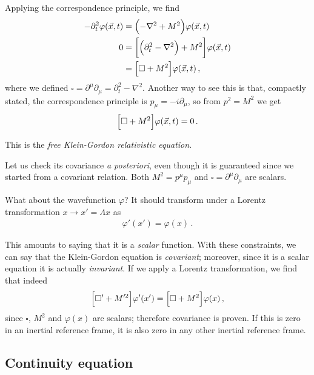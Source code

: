 \documentclass[main.tex]{subfiles}
\begin{document}
Applying the correspondence principle, we find 
%
\begin{align}
- \partial_{t}^2 \varphi (\vec{x}, t) &= \qty(- \nabla^2 + M^2) \varphi (\vec{x}, t)  \\
0 &= \qty[\qty(\partial_{t}^2 - \nabla^2) + M^2] \varphi (\vec{x}, t)   \\
&= \qty[\square + M^2] \varphi (\vec{x}, t)
\,,
\end{align}
%
where we defined \(\square = \partial^{\mu } \partial_{\mu } = \partial_{t}^2 - \nabla^2\). 
Another way to see this is that, compactly stated, the correspondence principle is \(p_{\mu } = -i  \partial_{\mu }\), so from \(p^2= M^2\) we get 
%
\begin{align}
\qty[\square + M^2] \varphi (\vec{x}, t) = 0
\,.
\end{align}

This is the \emph{free Klein-Gordon relativistic equation}. 

Let us check its covariance \emph{a posteriori}, even though it is guaranteed since we started from a covariant relation. 
Both \(M^2 = p^{\mu } p_{\mu }\) and \(\square = \partial^{\mu } \partial_{\mu }\) are scalars.

What about the wavefunction \(\varphi \)?
It should transform under a Lorentz transformation \(x \rightarrow x' = \Lambda x\) as 
%
\begin{align}
\varphi' (x')= \varphi (x)
\,.
\end{align}

This amounts to saying that it is a \emph{scalar} function. 
With these constraints, we can say that the Klein-Gordon equation is \emph{covariant}; moreover, since it is a scalar equation it is actually \emph{invariant}. 
If we apply a Lorentz transformation, we find that indeed 
%
\begin{align}
\qty[\square' + M^{\prime 2} ] \varphi^{\prime } (x^{\prime }) = \qty[\square + M^2] \varphi (x)
\,,
\end{align}
%
since \(\square\), \(M^2\) and \(\varphi (x)\) are scalars; therefore covariance is proven. 
If this is zero in an inertial reference frame, it is also zero in any other inertial reference frame. 

\subsection{Continuity equation}
\end{document}
